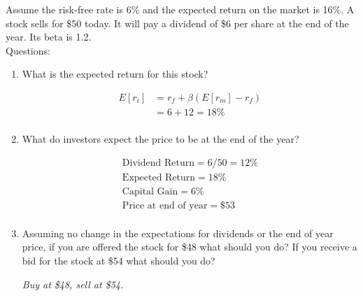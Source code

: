\documentclass[11pt]{article}
\theoremstyle{definition}
\begin{document}
    \begin{shaded}
        Assume the risk-free rate is 6\% and the expected return on the market is 16\%.
        A stock sells for \$50 today.   
        It will pay a dividend of \$6 per share at the end of the year.   
        Its beta is 1.2.\\
        \vspace{1em}
        Questions:\\
        \begin{enumerate}
            \item What is the expected return for this stock?

            \begin{align*}
                E[r_i] &= r_f + \beta(E[r_m]-r_f) \\
                 &= 6 + 12 = 18\% \\
            \end{align*}
            
            \item What do investors expect the price to be at the end of the year?

            \begin{align*}
                \text{Dividend Return} = 6/50 = 12\%\\
                \text{Expected Return} = 18\%\\
                \text{Capital Gain} = 6\%\\
                \text{Price at end of year} = \$53\\
            \end{align*}

            \item Assuming no change in the expectations for dividends or the end of year price, if you are offered the stock for \$48 what should you do?   If you receive a bid for the stock at \$54 what should you do?

            \textit{Buy at \$48, sell at \$54.}
            
        \end{enumerate}
    \end{shaded}
\end{document}
